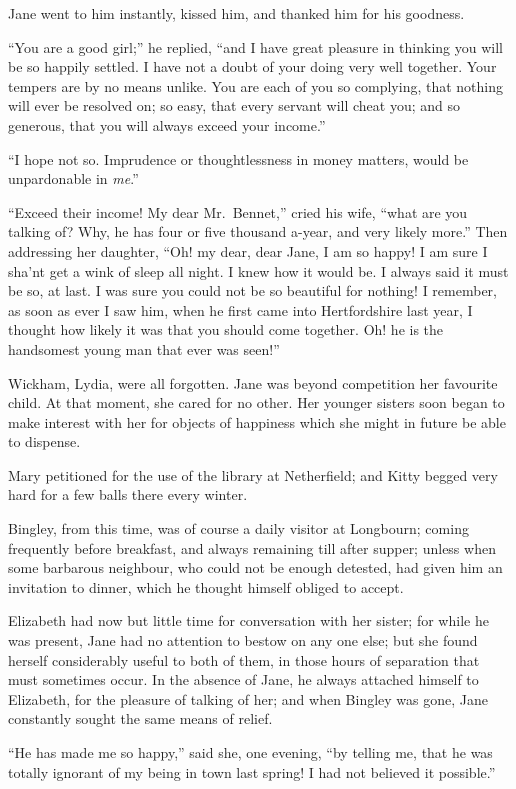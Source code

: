 Jane went to him instantly, kissed him, and thanked
him for his goodness.

“You are a good girl;” he replied, “and I have great
pleasure in thinking you will be so happily settled. I have
not a doubt of your doing very well together. Your
tempers are by no means unlike. You are each of you so
complying, that nothing will ever be resolved on; so
easy, that every servant will cheat you; and so generous,
that you will always exceed your income.”

“I hope not so. Imprudence or thoughtlessness in
money matters, would be unpardonable in \textit{me}.”

“Exceed their income! My dear Mr.\ Bennet,” cried
his wife, “what are you talking of? Why, he has four
or five thousand a-year, and very likely more.” Then
addressing her daughter, “Oh! my dear, dear Jane, I am
so happy! I am sure I sha’nt get a wink of sleep all night.
I knew how it would be. I always said it must be so,
at last. I was sure you could not be so beautiful for
nothing! I remember, as soon as ever I saw him, when
he first came into Hertfordshire last year, I thought how
likely it was that you should come together. Oh! he is
the handsomest young man that ever was seen!”

Wickham, Lydia, were all forgotten. Jane was beyond
competition her favourite child. At that moment, she
cared for no other. Her younger sisters soon began to
make interest with her for objects of happiness which she
might in future be able to dispense.

Mary petitioned for the use of the library at Netherfield;
and Kitty begged very hard for a few balls there every
winter.

Bingley, from this time, was of course a daily visitor
at Longbourn; coming frequently before breakfast, and
always remaining till after supper; unless when some
barbarous neighbour, who could not be enough detested,
had given him an invitation to dinner, which he thought
himself obliged to accept.

Elizabeth had now but little time for conversation with
her sister; for while he was present, Jane had no attention
to bestow on any one else; but she found herself considerably
useful to both of them, in those hours of separation
that must sometimes occur. In the absence of Jane,
he always attached himself to Elizabeth, for the pleasure
of talking of her; and when Bingley was gone, Jane
constantly sought the same means of relief.

“He has made me so happy,” said she, one evening,
“by telling me, that he was totally ignorant of my
being in town last spring! I had not believed it
possible.”

